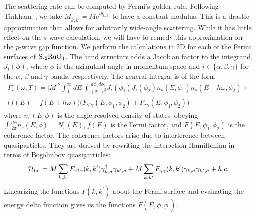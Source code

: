 	The scattering rate can be computed by Fermi's golden rule. Following Tinkham~\cite{Tinkham}, we take $M_{k,k^\prime}=Me^{i\theta_{k,k^\prime}}$ to have a constant modulus. This is a drastic approximation that allows for arbitrarily wide-angle scattering. While it has little effect on the $s$-wave calculation, we will have to remedy this approximation for the $p$-wave gap function. We perform the calculations in 2D for each of the Fermi surfaces of ${\rm Sr}_2{\rm RuO}_4$. The band structure adds a Jacobian factor to the integrand, $J_i(\phi)$, where $\phi$ is the azimuthal angle in momentum space and $i\in\{\alpha,\beta,\gamma\}$ for the $\alpha$, $\beta$ and $\gamma$ bands, respectively. The general integral is of the form
	\begin{multline}
	\Gamma_s(\omega,T)=|M|^2\int_0^\infty dE~\int\frac{d\phi_1d\phi_2}{(2\pi)^2}J_i(\phi_1)J_i(\phi_2)n_s(E,\phi_1)n_s(E+\hbar\omega,\phi_2)\times\\\big(f(E)-f(E+\hbar\omega)\big)\big(F_{\gamma^\dagger\gamma}(E,\phi_1,\phi_2)+F_{\gamma\gamma}(E,\phi_1,\phi_2)\big)
	\label{eq:gammaS}
	\end{multline}
	where $n_s(E,\phi)$ is the angle-resolved density of states, obeying $\int \frac{d\phi}{2\pi}n_s(E,\phi)=N_s(E)$, $f(E)$ is the Fermi factor, and $F(E,\phi_1,\phi_2)$ is the coherence factor. The coherence factors arise due to interference between quasiparticles. They are derived by rewriting the interaction Hamiltonian in terms of Bogoliubov quasiparticles:
	\begin{equation}
	\mathcal{H}_{\rm int}=M\sum_{k,k^\prime}F_{\gamma^\dagger\gamma}(k,k^\prime)\gamma^\dagger_{k,\sigma}\gamma_{k^\prime,\sigma}+M\sum_{k,k^\prime}F_{\gamma\gamma}(k,k^\prime)\gamma_{k,\sigma}\gamma_{k^\prime,\sigma}+h.c.
	\end{equation}
	Linearizing the functions $F(k,k^\prime)$ about the Fermi surface and evaluating the energy delta function gives us the functions $F(E,\phi,\phi^\prime)$.
	

